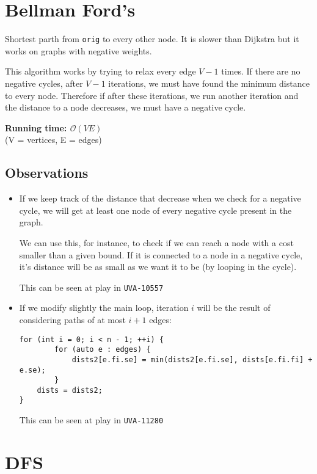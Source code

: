 \documentclass[12pt]{report}
\begin{document}
\section{Bellman Ford's}
Shortest parth from \texttt{orig} to every other node. It is slower than Dijkstra but 
it works on graphs with negative weights. 

This algorithm works by trying to relax every edge $V-1$ times. If there are no 
negative cycles, after $V-1$ iterations, we must have found the minimum distance
to every node. Therefore if after these iterations, we run another
iteration and the distance to a node decreases, we must have a negative cycle.

\noindent \textbf{\boldmath Running time: $\mathcal{O}(VE)$}
\\ {\small(V = vertices, E = edges)}
\subsection*{Observations}
\begin{itemize}
	\item If we keep track of the distance that decrease when we check for
		a negative cycle, we will get at least one node of 
		every negative cycle present in the graph.

		We can use this, for instance, to check if we can reach a node with 
		a cost smaller than a given bound. If it is connected to a node in a 
		negative cycle, it's distance will be as small as we want it to be
		(by looping in the cycle).

		This can be seen at play in \texttt{UVA-10557}
	\item If we modify slightly the main loop, iteration $i$ will be the 
		result of considering paths of at most $i+1$ edges:
		\begin{verbatim}
for (int i = 0; i < n - 1; ++i) {
        for (auto e : edges) {
            dists2[e.fi.se] = min(dists2[e.fi.se], dists[e.fi.fi] + e.se);
        }
	dists = dists2;
}
		\end{verbatim}
		This can be seen at play in \texttt{UVA-11280}
		

\end{itemize}	

\section{DFS}
\end{document}
